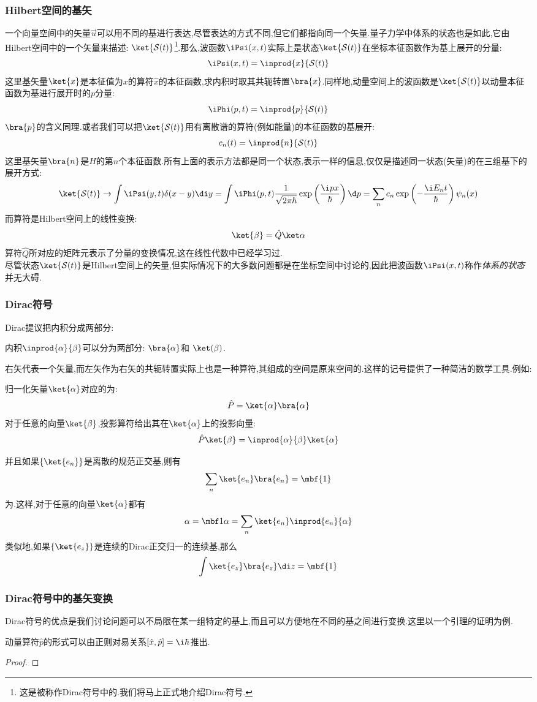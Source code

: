 \documentclass{ctexart}
\begin{document}
\subsubsection{Hilbert空间的基矢}
一个向量空间中的矢量$\vec{u}$可以用不同的基进行表达,尽管表达的方式不同,但它们都指向同一个矢量.量子力学中体系的状态也是如此,它由Hilbert空间中的一个矢量来描述: $\ket{\mathcal{S}(t)}$\footnote{这是被称作Dirac符号中的.我们将马上正式地介绍Dirac符号.}.那么,波函数$\iPsi(x,t)$实际上是状态$\ket{\mathcal{S}(t)}$在坐标本征函数作为基上展开的分量:
\[\iPsi(x,t)=\inprod{x}{\mathcal{S}(t)}\]
这里基矢量$\ket{x}$是本征值为$x$的算符$\hat{x}$的本征函数,求内积时取其共轭转置$\bra{x}$.同样地,动量空间上的波函数是$\ket{\mathcal{S}(t)}$以动量本征函数为基进行展开时的$p$分量:
\[\iPhi(p,t)=\inprod{p}{\mathcal{S}(t)}\]
$\bra{p}$的含义同理.或者我们可以把$\ket{\mathcal{S}(t)}$用有离散谱的算符(例如能量)的本征函数的基展开:
\[c_n(t)=\inprod{n}{\mathcal{S}(t)}\]
这里基矢量$\bra{n}$是$\hat{H}$的第$n$个本征函数.所有上面的表示方法都是同一个状态,表示一样的信息,仅仅是描述同一状态(矢量)的在三组基下的展开方式:
\[\ket{\mathcal{S}(t)}\to\int\iPsi(y,t)\delta(x-y)\di y=\int\iPhi(p,t)\dfrac{1}{\sqrt{2\pi\hbar}}\exp\left(\dfrac{\i px}{\hbar}\right)\d p=\sum_{n}c_n\exp\left(-\dfrac{\i E_n t}{\hbar}\right)\psi_n(x)\]
\indent 而算符是Hilbert空间上的线性变换:
\[\ket{\beta}=\hat{Q}\ket\alpha\]
算符$\hat{Q}$所对应的矩阵元表示了分量的变换情况,这在线性代数中已经学习过.\\
\indent 尽管状态$\ket{\mathcal{S}(t)}$是Hilbert空间上的矢量,但实际情况下的大多数问题都是在坐标空间中讨论的,因此把波函数$\iPsi(x,t)$称作\textit{体系的状态}并无大碍.
\subsubsection{Dirac符号}
Dirac提议把内积分成两部分:
\begin{definition}[Dirac符号]
    内积$\inprod{\alpha}{\beta}$可以分为两部分: $\bra{\alpha}$和 $\ket(\beta)$.
\end{definition}
右矢代表一个矢量,而左矢作为右矢的共轭转置实际上也是一种算符,其组成的空间是原来空间的.这样的记号提供了一种简洁的数学工具.例如:
\begin{definition}[投影算符]
    归一化矢量$\ket{\alpha}$对应的为:
    \[\hat{P}=\ket{\alpha}\bra{\alpha}\]
    对于任意的向量$\ket{\beta}$,投影算符给出其在$\ket{\alpha}$上的投影向量:
    \[\hat{P}\ket{\beta}=\inprod{\alpha}{\beta}\ket{\alpha}\]
\end{definition}
并且如果$\left\{\ket{e_n}\right\}$是离散的规范正交基,则有
\[\sum_{n}\ket{e_n}\bra{e_n}=\mbf{1}\]
为.这样,对于任意的向量$\ket{\alpha}$都有
\[\alpha=\mbf1\alpha=\sum_{n}\ket{e_n}\inprod{e_n}{\alpha}\]
类似地,如果$\left\{\ket{e_z}\right\}$是连续的Dirac正交归一的连续基,那么
\[\int\ket{e_z}\bra{e_z}\di z=\mbf{1}\]
\subsubsection{Dirac符号中的基矢变换}
Dirac符号的优点是我们讨论问题可以不局限在某一组特定的基上,而且可以方便地在不同的基之间进行变换.这里以一个引理的证明为例.
\begin{lemma}
    动量算符$\hat{p}$的形式可以由正则对易关系$\left[\hat{x},\hat{p}\right]=\i\hbar$推出.
\end{lemma}
\begin{proof}
    
\end{proof}
\end{document}
